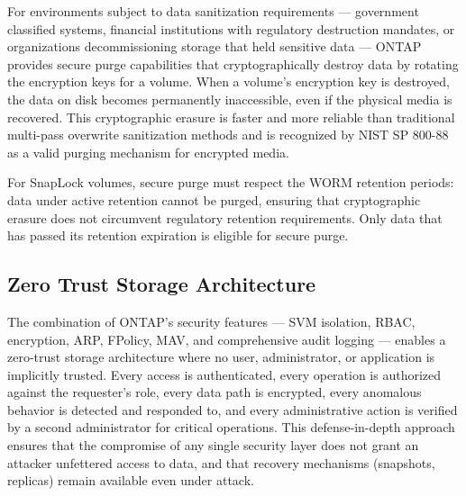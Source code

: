 \begin{securitybox}
For environments subject to data sanitization requirements --- government classified systems, financial institutions with regulatory destruction mandates, or organizations decommissioning storage that held sensitive data --- ONTAP provides secure purge capabilities that cryptographically destroy data by rotating the encryption keys for a volume. When a volume's encryption key is destroyed, the data on disk becomes permanently inaccessible, even if the physical media is recovered. This cryptographic erasure is faster and more reliable than traditional multi-pass overwrite sanitization methods and is recognized by NIST SP 800-88 as a valid purging mechanism for encrypted media.

For SnapLock volumes, secure purge must respect the WORM retention periods: data under active retention cannot be purged, ensuring that cryptographic erasure does not circumvent regulatory retention requirements. Only data that has passed its retention expiration is eligible for secure purge.

\subsection*{Zero Trust Storage Architecture}

The combination of ONTAP's security features --- SVM isolation, RBAC, encryption, ARP, FPolicy, MAV, and comprehensive audit logging --- enables a zero-trust storage architecture where no user, administrator, or application is implicitly trusted. Every access is authenticated, every operation is authorized against the requester's role, every data path is encrypted, every anomalous behavior is detected and responded to, and every administrative action is verified by a second administrator for critical operations. This defense-in-depth approach ensures that the compromise of any single security layer does not grant an attacker unfettered access to data, and that recovery mechanisms (snapshots, replicas) remain available even under attack.

\end{securitybox}
